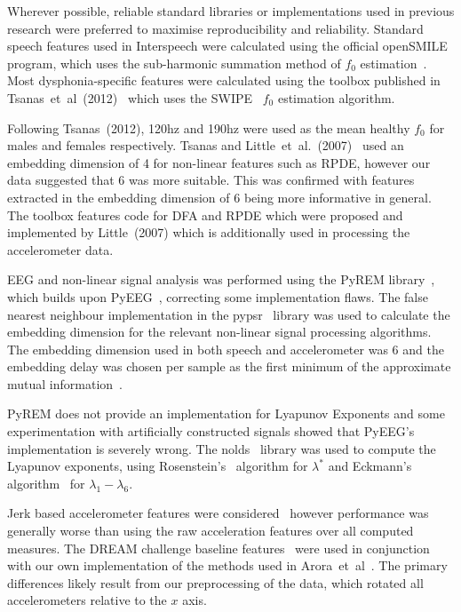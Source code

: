 \documentclass[12pt, twoside]{book}
\begin{document}
Wherever possible, reliable standard libraries or implementations used in previous research were preferred to maximise reproducibility and reliability. Standard speech features used in Interspeech were calculated using the official openSMILE~\cite{opensmile} program, which uses the sub-harmonic summation method of $f_0$ estimation~\cite{shs}. Most dysphonia-specific features were calculated using the toolbox published in Tsanas~et~al~(2012)~\cite{spoverview} which uses the SWIPE~\cite{camacho2007swipe,f0estimation} $f_0$ estimation algorithm. 

Following Tsanas~(2012), 120hz and 190hz were used as the mean healthy $f_0$ for males and females respectively. Tsanas and Little~et~al.~(2007)~\cite{splittlenonlinear2007} used an embedding dimension of 4 for non-linear features such as RPDE, however our data suggested that 6 was more suitable. This was confirmed with features extracted in the embedding dimension of 6 being more informative in general. The toolbox features code for DFA and RPDE which were proposed and implemented by Little~(2007) which is additionally used in processing the accelerometer data.

EEG and non-linear signal analysis was performed using the PyREM library~\cite{pyrem}, which builds upon PyEEG~\cite{pyeeg}, correcting some implementation flaws. The false nearest neighbour implementation in the pypsr~\cite{pypsr} library was used to calculate the embedding dimension for the relevant non-linear signal processing algorithms. The embedding dimension used in both speech and accelerometer was 6 and the embedding delay was chosen per sample as the first minimum of the approximate mutual information~\cite{rosenstein1993practicallyapunov}.
 
PyREM does not provide an implementation for Lyapunov Exponents and some experimentation with artificially constructed signals showed that PyEEG's implementation is severely wrong. The nolds~\cite{nolds} library was used to compute the Lyapunov exponents, using Rosenstein's~\cite{rosenstein1993practicallyapunov} algorithm for $\lambda^*$ and Eckmann's algorithm~\cite{eckmann1986liapunov} for $\lambda_1 - \lambda_6$.
  
Jerk based accelerometer features were considered~\cite{jerkfeature} however performance was generally worse than using the raw acceleration features over all computed measures. The DREAM challenge baseline features~\cite{mpowertools} were used in conjunction with our own implementation of the methods used in Arora~et~al~\cite{arora2014high}. The primary differences likely result from our preprocessing of the data, which rotated all accelerometers relative to the $x$ axis.
\end{document}
